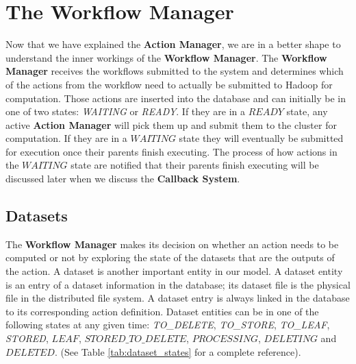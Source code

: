 \section{The Workflow Manager}
Now that we have explained the \textbf{Action Manager}, we are in a better shape to understand the inner workings of the \textbf{Workflow Manager}. The \textbf{Workflow Manager} receives the workflows submitted to the system and determines which of the actions from the workflow need to actually be submitted to Hadoop for computation. Those actions are inserted into the database and can initially be in one of two states: \textit{WAITING} or \textit{READY}. If they are in a $READY$ state, any active \textbf{Action Manager} will pick them up and submit them to the cluster for computation. If they are in a $WAITING$ state they will eventually be submitted for execution once their parents finish executing. The process of how actions in the $WAITING$ state are notified that their parents finish executing will be discussed later when we discuss the \textbf{Callback System}.

\subsection{Datasets}
The \textbf{Workflow Manager} makes its decision on whether an action needs to be computed or not by exploring the state of the datasets that are the outputs of the action. A dataset is another important entity in our model. A dataset entity is an entry of a dataset information in the database; its dataset file is the physical file in the distributed file system. A dataset entry is always linked in the database to its corresponding action definition. Dataset entities can be in one of the following states at any given time: \textit{TO\_DELETE}, \textit{TO\_STORE}, \textit{TO\_LEAF}, \textit{STORED}, $LEAF$, $STORED\_TO\_DELETE$, $PROCESSING$, $DELETING$ and $DELETED$. (See Table \ref{tab:dataset_states} for a complete reference).

